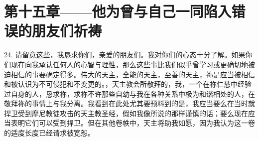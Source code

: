 
\section{第十五章——他为曾与自己一同陷入错误的朋友们祈祷}

24. 请留意这些，我恳求你们，亲爱的朋友们。我对你们的心态十分了解。如果你们现在向我承认任何人的心智与理性，那么这些事比我们似乎曾学习或更确切地被迫相信的事要确定得多。伟大的天主，全能的天主，至善的天主，祢是应当被相信和被认识为不可侵犯和不变更的。，天主教会所敬拜的，我，一个在祢仁慈中经验过自身的人，恳求祢，求祢不许那些自幼与我在各种关系中极为和谐相处的人，在敬拜祢的事情上与我分离。我看到在此处尤其要预料到的是，我应当要么在当时就捍卫受到摩尼教徒攻击的天主教圣经，假如我像所说的那样谨慎的话；要么现在应当表明它们可以受到捍卫。但在其他卷帙中，天主将助我如愿，因为我认为这一卷的适度长度已经请求被宽恕。\par

